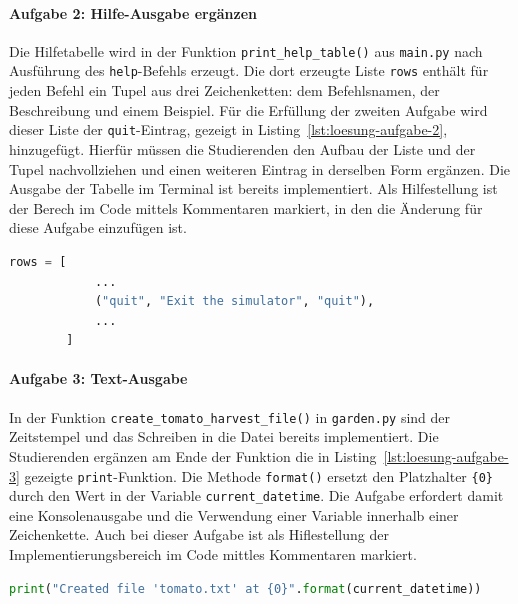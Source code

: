 \paragraph*{Aufgabe 2: Hilfe-Ausgabe ergänzen}
Die Hilfetabelle wird in der Funktion \texttt{print\_\allowbreak help\_\allowbreak table()} aus \texttt{main.py} nach Ausführung des \texttt{help}-Befehls erzeugt. Die dort erzeugte Liste \texttt{rows} enthält für jeden Befehl ein Tupel aus drei Zeichenketten: dem Befehlsnamen, der Beschreibung und einem Beispiel. Für die Erfüllung der zweiten Aufgabe wird dieser Liste der \texttt{quit}-Eintrag, gezeigt in Listing~\ref{lst:loesung-aufgabe-2}, hinzugefügt. Hierfür müssen die Studierenden den Aufbau der Liste und der Tupel nachvollziehen und einen weiteren Eintrag in derselben Form ergänzen. Die Ausgabe der Tabelle im Terminal ist bereits implementiert. Als Hilfestellung ist der Berech im Code mittels Kommentaren markiert, in den die Änderung für diese Aufgabe einzufügen ist.

\begin{lstlisting}[style=mystyle,language=Python,columns=fullflexible,gobble=8,caption={Zusätzlicher Eintrag in der Liste rows in main.py.},label={lst:loesung-aufgabe-2}]
        rows = [
            ...
            ("quit", "Exit the simulator", "quit"),
            ...
        ]
\end{lstlisting}

\paragraph*{Aufgabe 3: Text-Ausgabe}
In der Funktion \texttt{create\_\allowbreak tomato\_\allowbreak harvest\_\allowbreak file()} in \texttt{garden.\allowbreak py} sind der Zeitstempel und das Schreiben in die Datei bereits implementiert. Die Studierenden ergänzen am Ende der Funktion die in Listing~\ref{lst:loesung-aufgabe-3} gezeigte \texttt{print}-Funktion. Die Methode \texttt{format()} ersetzt den Platzhalter \texttt{\{0\}} durch den Wert in der Variable \texttt{current\_\allowbreak datetime}. Die Aufgabe erfordert damit eine Konsolenausgabe und die Verwendung einer Variable innerhalb einer Zeichenkette. Auch bei dieser Aufgabe ist als Hiflestellung der Implementierungsbereich im Code mittles Kommentaren markiert.

\begin{lstlisting}[style=mystyle,language=Python,columns=fullflexible,gobble=4,caption={Ergänzte Ausgabe in create\_tomato\_harvest\_file().},label={lst:loesung-aufgabe-3}]
    print("Created file 'tomato.txt' at {0}".format(current_datetime))
\end{lstlisting}

